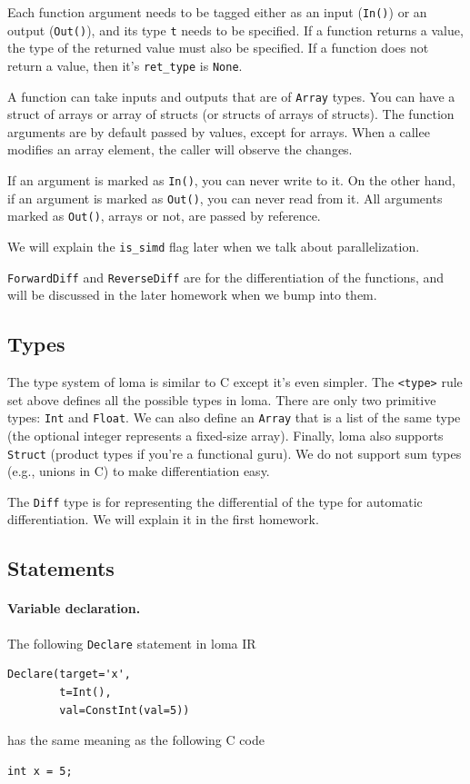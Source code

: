 Each function argument needs to be tagged either as an input (\lstinline{In()}) or an output (\lstinline{Out()}), and its type \lstinline{t} needs to be specified. If a function returns a value, the type of the returned value must also be specified. If a function does not return a value, then it's \lstinline{ret_type} is \lstinline{None}.

A function can take inputs and outputs that are of \lstinline{Array} types. You can have a struct of arrays or array of structs (or structs of arrays of structs). The function arguments are by default passed by values, except for arrays. When a callee modifies an array element, the caller will observe the changes.

If an argument is marked as \lstinline{In()}, you can never write to it. On the other hand, if an argument is marked as \lstinline{Out()}, you can never read from it. All arguments marked as \lstinline{Out()}, arrays or not, are passed by reference.

We will explain the \lstinline{is_simd} flag later when we talk about parallelization.

\lstinline{ForwardDiff} and \lstinline{ReverseDiff} are for the differentiation of the functions, and will be discussed in the later homework when we bump into them. 

\subsection{Types}

The type system of loma is similar to C except it's even simpler. The \lstinline{<type>} rule set above defines all the possible types in loma. There are only two primitive types: \lstinline{Int} and \lstinline{Float}. We can also define an \lstinline{Array} that is a list of the same type (the optional integer represents a fixed-size array). Finally, loma also supports \lstinline{Struct} (product types if you're a functional guru). We do not support sum types (e.g., unions in C) to make differentiation easy.

The \lstinline{Diff} type is for representing the differential of the type for automatic differentiation. We will explain it in the first homework.

\subsection{Statements}

\paragraph{Variable declaration.}
The following \lstinline{Declare} statement in loma IR
\begin{lstlisting}
Declare(target='x',
        t=Int(),
        val=ConstInt(val=5))
\end{lstlisting}
has the same meaning as the following C code
\begin{lstlisting}
int x = 5;
\end{lstlisting}

